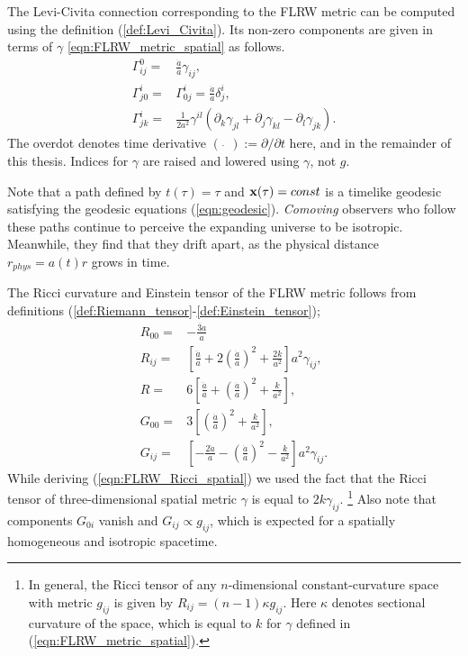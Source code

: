 The Levi-Civita connection corresponding to the FLRW metric can be computed using the definition (\ref{def:Levi_Civita}). Its non-zero components are given in terms of $\gamma$ \eqref{eqn:FLRW_metric_spatial} as follows.
\begin{align}
	\Gamma^0_{ij} =& \frac{\dot{a}}{a} \gamma_{ij}, \label{eqn:homogenous_christoffel_1}\\
	\Gamma^i_{j0} =& \Gamma^i_{0j} = \frac{\dot{a}}{a} \delta^i_j, \label{eqn:homogenous_christoffel_2}\\
	\Gamma^i_{jk} =& \frac{1}{2a^2} \gamma^{il} \left( \partial_k \gamma_{jl} + \partial_j \gamma_{kl} - \partial_l \gamma_{jk} \right).  \label{eqn:homogenous_christoffel_3}
\end{align}
The overdot denotes time derivative $(\,\, \dot{} \,\,) := \partial/\partial t$ here, and in the remainder of this thesis. Indices for $\gamma$ are raised and lowered using $\gamma$, not $g$.

Note that a path defined by $t(\tau)=\tau$ and $\mathbf{x}(\tau)=const$ is a timelike geodesic satisfying the geodesic equations (\ref{eqn:geodesic}). \textit{Comoving} observers who follow these paths continue to perceive the expanding universe to be isotropic. Meanwhile, they find that they drift apart, as the physical distance $r_{phys} = a(t) r$ grows in time.

The Ricci curvature and Einstein tensor of the FLRW metric follows from definitions (\ref{def:Riemann_tensor}-\ref{def:Einstein_tensor});
\begin{align}
	R_{00} =& - \frac{\ddot{3a}}{a} \\
	R_{ij} =& \left[ \frac{\ddot{a}}{a} + 2 \left( \frac{\dot{a}}{a} \right)^2 + \frac{2k}{a^2} \right] a^2 \gamma_{ij}, \label{eqn:FLRW_Ricci_spatial}\\
	R =& 6 \left[ \frac{\ddot{a}}{a} + \left( \frac{\dot{a}}{a} \right)^2 + \frac{k}{a^2} \right], \\
	G_{00} =& 3 \left[ \left( \frac{\dot{a}}{a} \right)^2 + \frac{k}{a^2} \right], \label{eqn:Einstein_tensor_FLRW_00} \\
	G_{ij} =& \left[ - \frac{2\ddot{a}}{a} - \left( \frac{\dot{a}}{a} \right)^2 - \frac{k}{a^2} \right] a^2 \gamma_{ij}. \label{eqn:Einstein_tensor_FLRW_ij}
\end{align}
While deriving (\ref{eqn:FLRW_Ricci_spatial}) we used the fact that the Ricci tensor of three-dimensional spatial metric $\gamma$ is equal to $2k\gamma_{ij}$. \footnote{In general, the Ricci tensor of any $n$-dimensional constant-curvature space with metric $g_{ij}$ is given by $R_{ij} = (n-1)\kappa g_{ij}$. Here $\kappa$ denotes sectional curvature of the space, which is equal to $k$ for $\gamma$ defined in (\ref{eqn:FLRW_metric_spatial}).} Also note that components $G_{0i}$ vanish and $G_{ij} \propto g_{ij}$, which is expected for a spatially homogeneous and isotropic spacetime.

